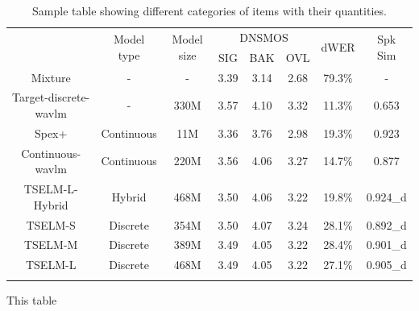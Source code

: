 \documentclass[conference]{IEEEtran}
\begin{document}
\begin{table}
    \setlength{\tabcolsep}{12pt} %
    \renewcommand{\arraystretch}{1.3}
    \begin{center}
        \begin{tabular}{cccccccc}
            \Xhline{2\arrayrulewidth} %
            \multirow{2}{*}{System} & \multirow{2}{*}{Model type} & \multirow{2}{*}{Model size} & \multicolumn{3}{c}{DNSMOS} & \multirow{2}{*}{dWER} & \multirow{2}{*}{Spk Sim} \\
                                    &                             &                             & SIG     & BAK     & OVL    &                       &                          \\
            \hline
            Mixture                 & -                           & -                           & 3.39    & 3.14    & 2.68   & 79.3\%                & -                        \\
            Target-discrete-wavlm   & -                           & 330M                           & 3.57    & 4.10    & 3.32   & 11.3\%                & 0.653                    \\
            \hline
            Spex+                   & Continuous                  & 11M                         & 3.36    & 3.76    & 2.98   & 19.3\%                & 0.923                    \\
            \hline
            Continuous-wavlm        & Continuous                  & 220M                        & 3.56    & 4.06    & 3.27   & 14.7\%                & 0.877                    \\
            TSELM-L-Hybrid          & Hybrid                      & 468M                        & 3.50    & 4.06    & 3.22   & 19.8\%                & 0.924\_d                 \\
            \hline
            TSELM-S                 & Discrete                    & 354M                        & 3.50    & 4.07    & 3.24   & 28.1\%                & 0.892\_d                 \\
            TSELM-M                 & Discrete                    & 389M                        & 3.49    & 4.05    & 3.22   & 28.4\%                & 0.901\_d                 \\
            TSELM-L                 & Discrete                    & 468M                        & 3.49    & 4.05    & 3.22   & 27.1\%                & 0.905\_d \\
            \Xhline{2\arrayrulewidth} %
            \end{tabular}
            \linebreak
            \caption{Sample table showing different categories of items with their quantities.}
            This table 
      \end{center}
      \label{main_exp}
  \end{table}
\end{document}
